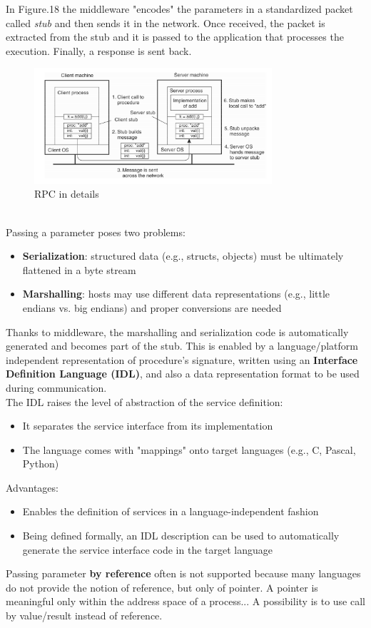 \documentclass[10pt,a4paper]{article}
\begin{document}
In Figure.18 the middleware "encodes" the parameters in a standardized packet called \textit{stub} and then sends it in the network. Once received, the packet is extracted from the stub and it is passed to the application that processes the execution. Finally, a response is sent back. \\
\begin{figure}[h!]
 \hfill \includegraphics[width=250pt]{images/rpc3.png}\hspace*{\fill}
 \caption{RPC in details}
  \label{fig:rpc3}
\end{figure} \\
Passing a parameter poses two problems:
\begin{itemize}
	\item \textbf{Serialization}: structured data (e.g., structs, objects) must be ultimately flattened in a byte stream
	\item \textbf{Marshalling}: hosts may use different data representations (e.g., little endians vs. big endians) and proper conversions are needed
\end{itemize}
Thanks to middleware, the marshalling and serialization code is automatically generated and becomes part of the stub. This is enabled by a language/platform independent representation of procedure's signature, written using an \textbf{Interface Definition Language (IDL)}, and also a data representation format to be used during communication. \\
The IDL raises the level of abstraction of the service definition: 
\begin{itemize}
	\item It separates the service interface from its implementation
	\item The language comes with "mappings" onto target languages (e.g., C, Pascal, Python)
\end{itemize}
Advantages:
\begin{itemize}
	\item Enables the definition of services in a language-independent fashion
	\item Being defined formally, an IDL description can be used to automatically generate the service interface code in the target language
\end{itemize}
Passing parameter \textbf{by reference} often is not supported because many languages do not provide the notion of reference, but only of pointer. A pointer is meaningful only within the address space of a process... A possibility is to use call by value/result instead of reference. 
\end{document}
